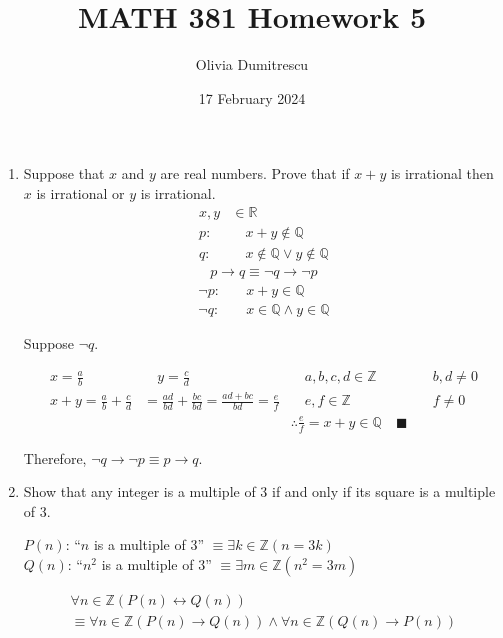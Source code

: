 \documentclass[letterpaper, 12pt]{article}
\title{MATH 381 Homework 5}
\author{Olivia Dumitrescu}
\date{17 February 2024}
\newcommand{\qed}{\quad \blacksquare}
\newcommand{\then}{\rightarrow}
\begin{document}
\maketitle
\begin{enumerate}
\item Suppose that $x$ and $y$ are real numbers. Prove that if $x + y$ is irrational then $x$ is 
irrational or $y$ is irrational.
\begin{align*}
    x, y& \in \mathbb{R} \\
    p:& \quad x + y \notin \mathbb{Q} \\
    q:& \quad x \notin \mathbb{Q} \vee y \notin \mathbb{Q}
\end{align*}
\begin{gather*}
    p \then q \equiv \neg q \then \neg p
\end{gather*}
\begin{align*}
    \neg p:& \quad x + y \in \mathbb{Q} \\
    \neg q:& \quad x \in \mathbb{Q} \wedge y \in \mathbb{Q}
\end{align*}
\begin{flushleft}
    Suppose $\neg q$.
\end{flushleft}
\begin{align*}
    x = \frac{a}{b} & \quad y = \frac{c}{d} &\quad a, b, c, d \in \mathbb{Z} &\quad b, d \ne 0 \\
    x + y = \frac{a}{b} + \frac{c}{d} &= \frac{ad}{bd} + \frac{bc}{bd} = \frac{ad + bc}{bd}
    = \frac{e}{f} &\quad e, f \in \mathbb{Z} &\quad f \ne 0 \\
    & & \therefore \frac{e}{f} = x + y \in \mathbb{Q} \qed
\end{align*}
\begin{flushleft}
    Therefore, $\neg q \then \neg p \equiv p \then q$.
\end{flushleft}
\pagebreak
\item Show that any integer is a multiple of 3 if and only if its square is a multiple of 3.
\begin{flushleft}
    $P(n)$: ``$n$ is a multiple of 3'' $\equiv \exists k \in \mathbb{Z} (n = 3k)$ \\
    $Q(n)$: ``$n^2$ is a multiple of 3'' $\equiv \exists m \in \mathbb{Z} (n^2 = 3m)$ 
\end{flushleft}
\begin{multline*}
    \forall n \in \mathbb{Z} (P(n) \leftrightarrow Q(n)) \\
    \equiv \forall n \in \mathbb{Z} (P(n) \then Q(n)) \wedge \forall n \in \mathbb{Z}(Q(n) \then P(n))

\end{multline*}
\end{enumerate}
\end{document}
